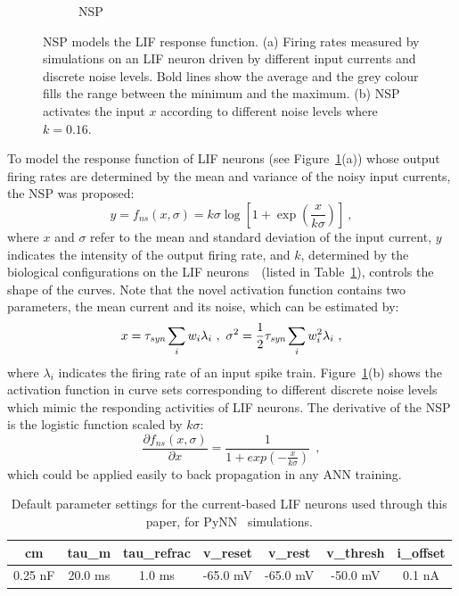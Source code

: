 \documentclass[10pt,journal,compsoc]{IEEEtran}
\begin{document}
\begin{figure}[thb!]
\begin{subfigure}[t]{0.4\textwidth}
			\caption{NSP}
		\end{subfigure}
		\caption{
			NSP models the LIF response function.
			(a) Firing rates measured by simulations on an LIF neuron driven by different input currents and discrete noise levels.
			Bold lines show the average and the grey colour fills the range between the minimum and the maximum.
			(b) NSP activates the input $x$ according to different noise levels where $k=0.16$.}
		\label{fig:ns}
	\end{figure}
	To model the response function of LIF neurons (see Figure~\ref{fig:ns}(a)) whose output firing rates are determined by the mean and variance of the noisy input currents, the NSP was proposed:
	\begin{equation}
	y = f_{ns}(x, \sigma) = k \sigma \log [1 + \exp(\frac{x}{k \sigma})]~,
	\label{equ:nsp}
	\end{equation}
	where $x$ and $\sigma$ refer to the mean and standard deviation of the input current, $y$ indicates the intensity of the output firing rate, and $k$, determined by the biological configurations on the LIF neurons~\cite{liu2016noisy}~(listed in Table~\ref{tbl:pynnConfig}), controls the shape of the curves.
	Note that the novel activation function contains two parameters, the mean current and its noise, which can be estimated by:
	\begin{equation}
	x = \tau_{\textit{\textrm{syn}}}\sum_i w_i\lambda_{i}~, ~\sigma^2=\frac{1}{2}\tau_{\textit{\textrm{syn}}}\sum_i w_i^2\lambda_{i}~,
	\label{equ:distr}
	\end{equation}
	where $\lambda_i$ indicates the firing rate of an input spike train.
	Figure~\ref{fig:ns}(b) shows the activation function in curve sets corresponding to different discrete noise levels which mimic the responding activities of LIF neurons.
	The derivative of the NSP is the logistic function scaled by $k\sigma$:
	\begin{equation}
	\frac{\partial f_{ns}(x,\sigma)}{\partial x} = \frac{1}{1+exp(-\frac{x}{k\sigma})}~~,
	\label{equ:logist}
	\end{equation}	
	which could be applied easily to back propagation in any ANN training.
	
	\begin{table}[thb]
		\centering
		\caption{\label{tbl:pynnConfig}Default parameter settings for the current-based LIF neurons used through this paper, for PyNN~\cite{davison2008pynn} simulations.}
		\bgroup
		\def\arraystretch{1.4}
		\begin{tabular}{c c c c c c c}
			cm & tau\_m & tau\_refrac & v\_reset & v\_rest& v\_thresh & i\_offset \\
			\hline
			0.25 nF & 20.0 ms & 1.0 ms & -65.0 mV & -65.0 mV & -50.0 mV &  0.1 nA 
		\end{tabular}
		\egroup
	\end{table}
	
\end{document}
